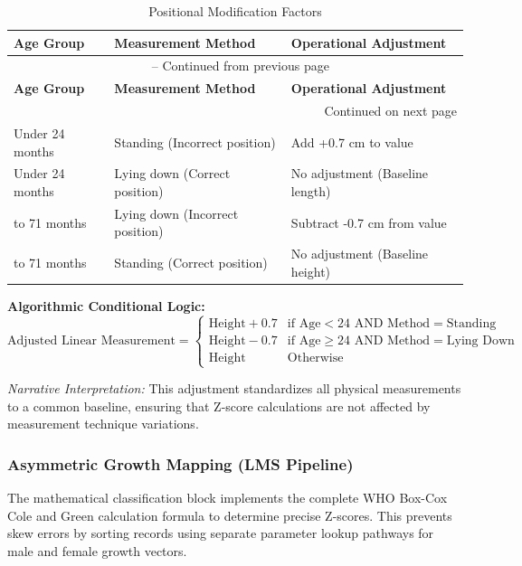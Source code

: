 \documentclass[12pt, a4paper]{report}
\begin{document}
\vspace{0.3cm}
\begin{longtable}{p{3.5cm} p{5cm} p{5cm}}
    \caption{Positional Modification Factors} \label{tab:positional} \\
    \toprule
    \textbf{Age Group} & \textbf{Measurement Method} & \textbf{Operational Adjustment} \\
    \midrule
    \endfirsthead
    \multicolumn{3}{c}{{\tablename\ \thetable{} -- Continued from previous page}} \\
    \toprule
    \textbf{Age Group} & \textbf{Measurement Method} & \textbf{Operational Adjustment} \\
    \midrule
    \endhead
    \midrule
    \multicolumn{3}{r}{{Continued on next page}} \\
    \endfoot
    \bottomrule
    \endlastfoot
    Under 24 months & Standing (Incorrect position) & Add +0.7 cm to value \\
    \addlinespace
    Under 24 months & Lying down (Correct position) & No adjustment (Baseline length) \\
    \addlinespace
    24 to 71 months & Lying down (Incorrect position) & Subtract -0.7 cm from value \\
    \addlinespace
    24 to 71 months & Standing (Correct position) & No adjustment (Baseline height) \\
\end{longtable}
\vspace{0.3cm}

\noindent \textbf{Algorithmic Conditional Logic:}
\begin{equation}
    \text{Adjusted Linear Measurement} = 
    \begin{cases} 
      \text{Height} + 0.7 & \text{if Age} < 24 \text{ AND Method} = \text{Standing} \\
      \text{Height} - 0.7 & \text{if Age} \geq 24 \text{ AND Method} = \text{Lying Down} \\
      \text{Height} & \text{Otherwise}
    \end{cases}
\end{equation}

\textit{Narrative Interpretation:} This adjustment standardizes all physical measurements to a common baseline, ensuring that Z-score calculations are not affected by measurement technique variations.

\subsubsection{Asymmetric Growth Mapping (LMS Pipeline)}
\label{subsubsec:lms}
The mathematical classification block implements the complete WHO Box-Cox Cole and Green calculation formula to determine precise Z-scores. This prevents skew errors by sorting records using separate parameter lookup pathways for male and female growth vectors.
\end{document}
